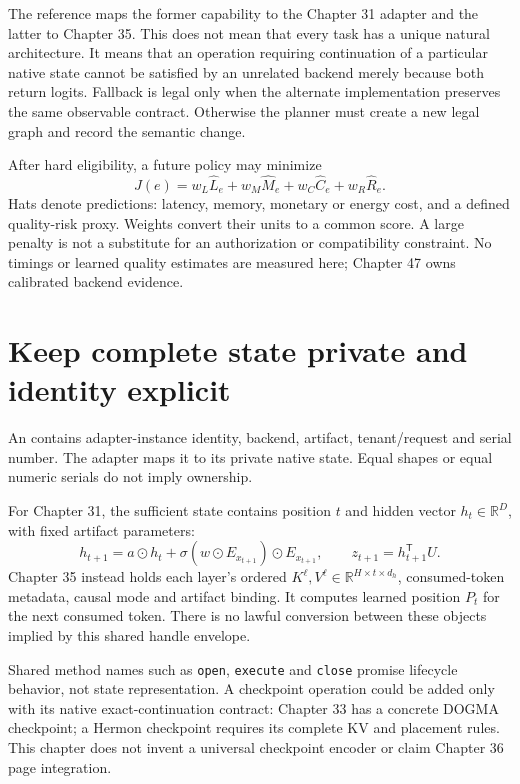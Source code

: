 The reference maps the former capability to the Chapter 31 adapter and the
latter to Chapter 35. This does not mean that every task has a unique natural
architecture. It means that an operation requiring continuation of a particular
native state cannot be satisfied by an unrelated backend merely because both
return logits. Fallback is legal only when the alternate implementation
preserves the same observable contract. Otherwise the planner must create
a new legal graph and record the semantic change.

After hard eligibility, a future policy may minimize
\[
 J(e)=w_L\widehat L_e+w_M\widehat M_e+w_C\widehat C_e+w_R\widehat R_e.
\]
Hats denote predictions: latency, memory, monetary or energy cost, and a
defined quality-risk proxy. Weights convert their units to a common score.
A large penalty is not a substitute for an authorization or compatibility
constraint. No timings or learned quality estimates are measured here;
Chapter 47 owns calibrated backend evidence.

\section{Keep complete state private and identity explicit}
\label{evod39:handles}
An  contains adapter-instance identity, backend, artifact,
tenant/request and serial number. The adapter maps it to its private native
state. Equal shapes or equal numeric serials do not imply ownership.

For Chapter 31, the sufficient state contains position $t$ and hidden vector
$h_t\in\mathbb R^D$, with fixed artifact parameters:
\[
 h_{t+1}=a\odot h_t+\sigma(w\odot E_{x_{t+1}})\odot E_{x_{t+1}},
 \qquad z_{t+1}=h_{t+1}^{\mathsf T}U.
\]
Chapter 35 instead holds each layer's ordered
$K^\ell,V^\ell\in\mathbb R^{H\times t\times d_h}$, consumed-token metadata,
causal mode and artifact binding. It computes learned position $P_t$ for the
next consumed token. There is no lawful conversion between these objects
implied by this shared handle envelope.

Shared method names such as \texttt{open}, \texttt{execute} and
\texttt{close} promise lifecycle behavior, not state representation.
A checkpoint operation could be added only with its native exact-continuation
contract: Chapter 33 has a concrete DOGMA checkpoint; a Hermon checkpoint
requires its complete KV and placement rules. This chapter does not invent a
universal checkpoint encoder or claim Chapter 36 page integration.

